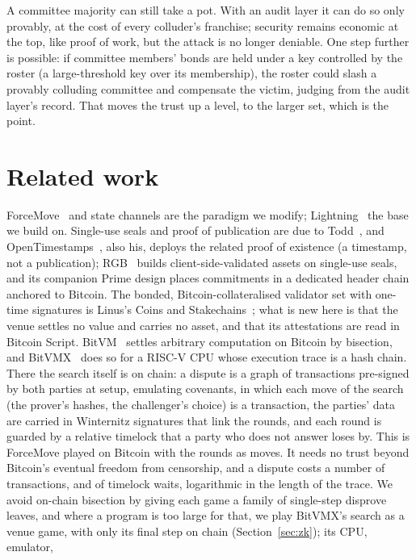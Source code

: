 \documentclass[11pt]{article}
\begin{document}
A committee majority can still take a pot. With an
audit layer it can do so only provably, at the cost of every colluder's
franchise; security remains economic at the top, like proof of work,
but the attack is no longer deniable. One step further is possible: if
committee members' bonds are held under a key controlled by the roster
(a large-threshold key over its membership), the roster could
slash a provably colluding committee and compensate the victim, judging
from the audit layer's record. That moves the trust up a level, to the
larger set, which is the point.

\section{Related work}
\label{sec:related}

ForceMove~\cite{forcemove} and state channels are the paradigm we
modify; Lightning~\cite{lightning} the base we build on. Single-use seals
and proof of publication are due to Todd~\cite{toddseals}, and
OpenTimestamps~\cite{ots}, also his, deploys the related proof of existence (a timestamp, not a publication); RGB~\cite{rgb}
builds client-side-validated assets on single-use seals, and its companion Prime
design places commitments in a dedicated header chain anchored to
Bitcoin. The bonded, Bitcoin-collateralised validator set with one-time
signatures is Linus's Coins and Stakechains~\cite{coins}; what is new
here is that the venue settles no value and carries no asset, and that
its attestations are read in Bitcoin Script. BitVM~\cite{bitvm} settles
arbitrary computation on Bitcoin by bisection, and BitVMX~\cite{bitvmx}
does so for a RISC-V CPU whose execution trace is a hash chain. There
the search itself is on chain: a dispute is a graph of transactions
pre-signed by both parties at setup, emulating covenants, in which each
move of the search (the prover's hashes, the challenger's choice) is a
transaction, the parties' data are carried in
Winternitz signatures that link the rounds, and each round is guarded
by a relative timelock that a party who does not answer loses by. This
is ForceMove played on Bitcoin with the rounds as moves. It needs no
trust beyond Bitcoin's eventual freedom from censorship, and a dispute
costs a number of transactions, and of timelock waits, logarithmic in
the length of the trace. We avoid on-chain bisection by giving each
game a family of single-step disprove leaves, and where a program is
too large for that, we play BitVMX's search as a venue game, with only
its final step on chain (Section~\ref{sec:zk}); its CPU, emulator,
\end{document}
